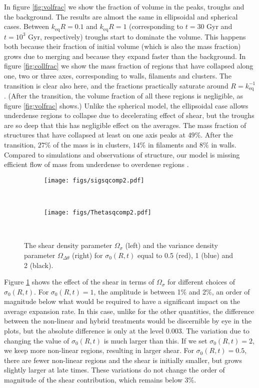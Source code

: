 \documentclass[11pt, a4paper]{article}
\newcommand{\fig}[1]{figure \ref{#1}}
\newcommand{\keq}{k_{\mathrm{eq}}}
\newcommand{\Ov}{\Omega_{\Delta\theta}}
\begin{document}
In \fig{fig:volfrac} we show the fraction of volume in the peaks, troughs and the background. The results are almost the same in ellipsoidal and spherical cases. Between $\keq R=0.1$ and $\keq R=1$ (corresponding to $t=30$ Gyr and $t=10^3$ Gyr, respectively) troughs start to dominate the volume. This happens both because their fraction of initial volume (which is also the mass fraction) grows due to merging and because they expand faster than the background. In \fig{fig:collfrac} we show the mass fraction of regions that have collapsed along one, two or three axes, corresponding to walls, filaments and clusters.  The transition is clear also here, and the fractions practically saturate around $R=\keq^{-1}$. (After the transition, the volume fraction of all these regions is negligible, as \fig{fig:volfrac} shows.)  Unlike the spherical model, the ellipsoidal case allows underdense regions to collapse due to decelerating effect of shear, but the troughs are so deep that this has negligible effect on the averages. The mass fraction of structures that have collapsed at least on one axis peaks at $49\%$. After the transition, $27\%$ of the mass is in clusters, $14\%$ in filaments and $8\%$ in walls. Compared to simulations and observations of structure, our model is missing efficient flow of mass from underdense to overdense regions \cite{Bond:1995yt, Cautun:2014fwa}.
\begin{figure}[t]
  \centering
  \begin{subfigure}[b]{0.48\textwidth}
    \texttt{[image: figs/sigsqcomp2.pdf]}
    \caption{}
    \label{fig:sigma}
  \end{subfigure}
  ~
  \begin{subfigure}[b]{0.48\textwidth}
  \texttt{[image: figs/Thetasqcomp2.pdf]}
  \caption{}
  \label{fig:difRvar}
  \end{subfigure}
  \\

  \caption{The shear density parameter $\Omega_{\sigma}$ (left) and
    the variance density parameter $\Ov$ (right) for $\sigma_0(R,t)$
    equal to 0.5 (red), 1 (blue) and 2 (black).}
  \label{fig:sigma_difRvar}

\end{figure}

Figure \ref{fig:sigma} shows the effect of the shear in terms of $\Omega_\sigma$ for different choices of $\sigma_0(R,t)$. For $\sigma_0(R,t)=1$, the amplitude is between 1\% and 2\%, an order of magnitude below what would be required to have a significant impact on the average expansion rate. In this case, unlike for the other quantities, the difference between the non-linear and hybrid treatments would be discernible by eye in the plots, but the absolute difference is only at the level 0.003. The variation due to changing the value of $\sigma_0(R,t)$ is much larger than this. If we set $\sigma_0(R,t)=2$, we keep more non-linear regions, resulting in larger shear. For $\sigma_0(R,t)=0.5$, there are fewer non-linear regions and the shear is initially smaller, but grows slightly larger at late times. These variations do not change the order of magnitude of the shear contribution, which remains below 3\%.
\end{document}
